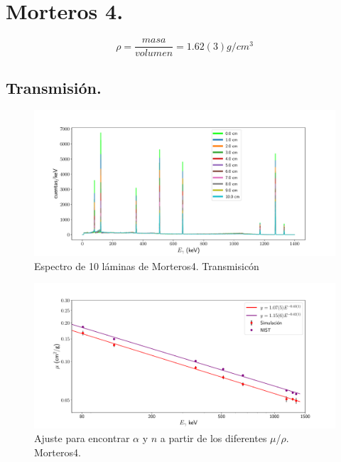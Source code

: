  
 
 
 \section{Morteros 4.}
 


 
 \begin{equation} \label{densidad-mor4}
 \rho=\frac{masa}{volumen}=1.62(3) g/cm^3
 \end{equation}
 
 \subsection{Transmisión.}
 
\begin{figure}[H]
	\centering
	\includegraphics[width=1.0\linewidth]{Kap4/espectro_m4-10M-trans.pdf}
	\caption{Espectro de 10 láminas de Morteros4. Transmisicón}
	\label{fig:espectrom4-10m-trans}
\end{figure}
 
\begin{figure}[H]
	\centering
	\includegraphics[width=1.0\linewidth]{Kap4/mu-trans-m4.pdf}
	\caption{Ajuste para encontrar $\alpha$ y $n$ a partir de los diferentes $\mu$/$\rho$. Morteros4.}
	\label{fig:mu-trans-m4}
\end{figure}
 
